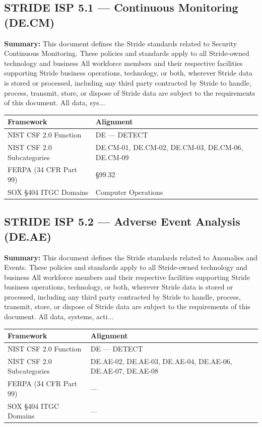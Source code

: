 \documentclass[11pt,landscape]{article}
\begin{document}
\subsection{\textcolor{strideblue}{STRIDE ISP 5.1} --- Continuous Monitoring (DE.CM)}
\label{pol:ISP51}

\textbf{Summary:} This document defines the Stride standards related to Security Continuous Monitoring. These policies and standards apply to all Stride-owned technology and business All workforce members and their respective facilities supporting Stride business operations, technology, or both, wherever Stride data is stored or processed, including any third party contracted by Stride to handle, process, transmit, store, or dispose of Stride data are subject to the requirements of this document. All data, sys...

\begin{tabularx}{\textwidth}{|p{4cm}|X|}
\hline
\rowcolor{headgray} \textbf{Framework} & \textbf{Alignment} \\
\hline
NIST CSF 2.0 Function & DE --- DETECT \\
\hline
NIST CSF 2.0 Subcategories & DE.CM-01, DE.CM-02, DE.CM-03, DE.CM-06, DE.CM-09 \\
\hline
FERPA (34 CFR Part 99) & §99.32 \\
\hline
SOX §404 ITGC Domains & Computer Operations \\
\hline
\end{tabularx}


\subsection{\textcolor{strideblue}{STRIDE ISP 5.2} --- Adverse Event Analysis (DE.AE)}
\label{pol:ISP52}

\textbf{Summary:} This document defines the Stride standards related to Anomalies and Events. These policies and standards apply to all Stride-owned technology and business All workforce members and their respective facilities supporting Stride business operations, technology, or both, wherever Stride data is stored or processed, including any third party contracted by Stride to handle, process, transmit, store, or dispose of Stride data are subject to the requirements of this document. All data, systems, acti...

\begin{tabularx}{\textwidth}{|p{4cm}|X|}
\hline
\rowcolor{headgray} \textbf{Framework} & \textbf{Alignment} \\
\hline
NIST CSF 2.0 Function & DE --- DETECT \\
\hline
NIST CSF 2.0 Subcategories & DE.AE-02, DE.AE-03, DE.AE-04, DE.AE-06, DE.AE-07, DE.AE-08 \\
\hline
FERPA (34 CFR Part 99) & --- \\
\hline
SOX §404 ITGC Domains & --- \\
\hline
\end{tabularx}
\end{document}
